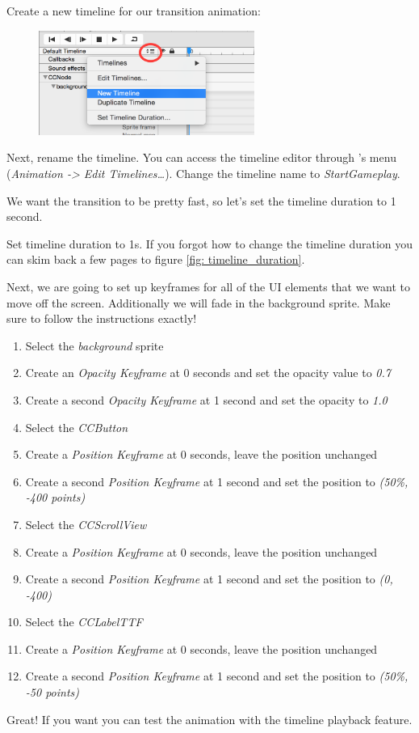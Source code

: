 \begin{leftbar}
Create a new timeline for our transition animation:
\begin{figure}[H]
		\centering
		\includegraphics[width=200pt]{images/Chapter7/new_timeline.png}
\end{figure}
Next, rename the timeline. You can access the timeline editor through \SB{}'s
menu (\textit{Animation -> Edit Timelines\ldots}). Change the timeline name to
\textit{StartGameplay}.
\end{leftbar}
We want the transition to be pretty fast, so let's set the timeline duration to
1 second.
\begin{leftbar}
Set timeline duration to 1s. If you forgot how to change the timeline duration
you can skim back a few pages to figure \ref{fig: timeline_duration}.
\end{leftbar}
Next, we are going to set up keyframes for all of the UI elements that we want
to move off the screen. Additionally we will fade in the background sprite. Make
sure to follow the instructions exactly!
\begin{leftbar}
\begin{enumerate}
  \item Select the \textit{background} sprite
  \item Create an \textit{Opacity Keyframe} at 0 seconds and set the opacity
  value to \textit{0.7}
  \item Create a second \textit{Opacity Keyframe} at 1 second and set the
  opacity to \textit{1.0}
  \item Select the \textit{CCButton}
  \item Create a \textit{Position Keyframe} at 0 seconds, leave the position
  unchanged
  \item Create a second \textit{Position Keyframe} at 1 second and set the
  position to \textit{(50\%, -400 points)}
  \item Select the \textit{CCScrollView}
  \item Create a \textit{Position Keyframe} at 0 seconds, leave the position
  unchanged
  \item Create a second \textit{Position Keyframe} at 1 second and set the
  position to \textit{(0, -400)} 
  \item Select the \textit{CCLabelTTF}
  \item Create a \textit{Position Keyframe} at 0 seconds, leave the position
  unchanged
  \item Create a second \textit{Position Keyframe} at 1 second and set the
  position to \textit{(50\%, -50 points)}  
\end{enumerate}
\end{leftbar}
Great! If you want you can test the animation with the \SB{} timeline playback
feature.

